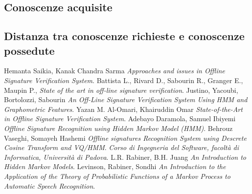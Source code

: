 \subsection{Conoscenze acquisite}

\label{4.2}
\subsection{Distanza tra conoscenze richieste e conoscenze possedute}

\label{4.3}
\newpage

\printglossaries
{}
\label{5.0}

\newpage
\begin{thebibliography}{1}
 Hemanta Saikia, Kanak Chandra Sarma {\em Approaches and issues in Offline Signature Verification System}.
 Battista L., Rivard D., Sabourin R., Granger E., Maupin P., {\em State of the art in off-line signature verification}.
 Justino, Yacoubi, Bortolozzi, Sabourin {\em An Off-Line Signature Verification System Using HMM and Graphometric Features}.
 Yazan M. Al-Omari, Khairuddin Omar {\em State-of-the-Art in Offline Signature Verification System}.
 Adebayo Daramola, Samuel Ibiyemi {\em Offline Signature Recognition using Hidden Markov Model (HMM)}.
 Behrouz Vaseghi, Somayeh Hashemi {\em Offline signatures Recognition System using Descrete Cosine Transform and VQ/HMM}.
 {\em Corso di Ingegneria del Software, facoltà di Informatica, Università di Padova}.
 L.R. Rabiner, B.H. Juang {\em An Introduction to Hidden Markov Models}.
 Levinson, Rabiner, Sondhi {\em An Introduction to the Application of the Theory of Probabilistic Functions of a Markov Process to Automatic Speech Recognition}.
\end{thebibliography}
\label{6.0}

\newpage





